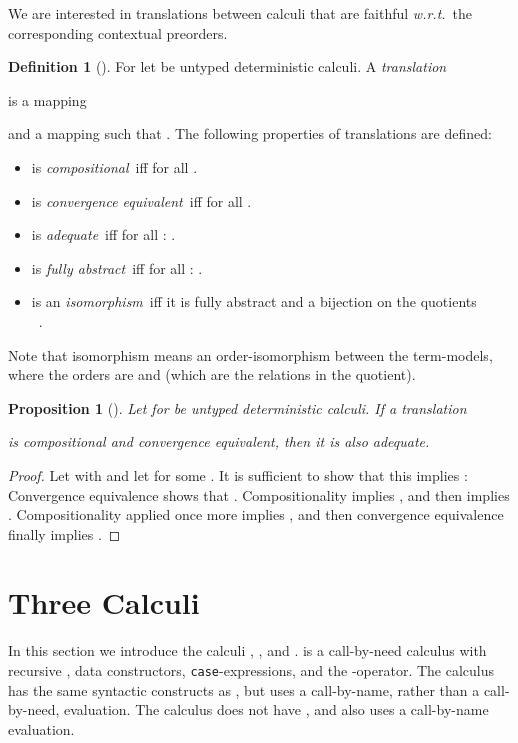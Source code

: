 \documentclass{LMCS}
\theoremstyle{plain}
\newtheorem{proposition}[thm]{Proposition}
\theoremstyle{definition}
\newtheorem{definition}[thm]{Definition}
\newcommand{\wrt}{{\em w.r.t.}}
\newcommand{\tcase}{{\tt case}}
\begin{document}
We are interested in translations between calculi that are faithful 
\wrt\ the corresponding contextual preorders. 
\begin{definition}[\cite{schmidt-schauss-niehren-schwinghammer-sabel-ifip-tcs:08,schmidt-schauss-niehren-schwinghammer-sabel-frank-33:09}]\label{def:translation-compo-etal}
For  let  be
untyped deterministic calculi.
A {\em translation} 

is a mapping 
 
and a mapping  such that
. 
The following properties of translations are defined:
\begin{itemize}
\item  is {\em compositional}\ iff  for all . 
\item  is {\em convergence equivalent}\ iff  for all . 
\item  is {\em adequate}\ iff for all : .
\item  is {\em fully abstract}\ iff for all : . 
\item  is an {\em isomorphism}\ iff it is fully abstract and a bijection on the quotients \\
\mbox{\hspace*{5mm} }. 
\end{itemize}
\end{definition}
Note that isomorphism means an order-isomorphism between the term-models, where
the orders are  and  (which are the relations
in the quotient).  

\begin{proposition}[\cite{schmidt-schauss-niehren-schwinghammer-sabel-ifip-tcs:08,schmidt-schauss-niehren-schwinghammer-sabel-frank-33:09}]\label{prop:adequate}
Let  for  be untyped deterministic calculi.
If a translation 

is compositional and convergence equivalent, then it is also adequate.
\end{proposition}
\begin{proof}
Let  with  and let 
 for some . 
It is sufficient to show that this implies : 
Convergence equivalence shows that . 
Compositionality implies , and then
 implies . 
Compositionality applied once more implies , and then
convergence equivalence finally implies . 
\end{proof}


\section{Three Calculi}\label{sec:calculi}
In this section we introduce the calculi , , and .
 is a call-by-need calculus with recursive , data constructors,
\tcase-expressions, and the -operator. 
The calculus  has the same syntactic constructs as , but uses a
call-by-name, rather than a call-by-need, evaluation. The calculus 
does not have , and also uses a call-by-name evaluation.
 
\end{document}
